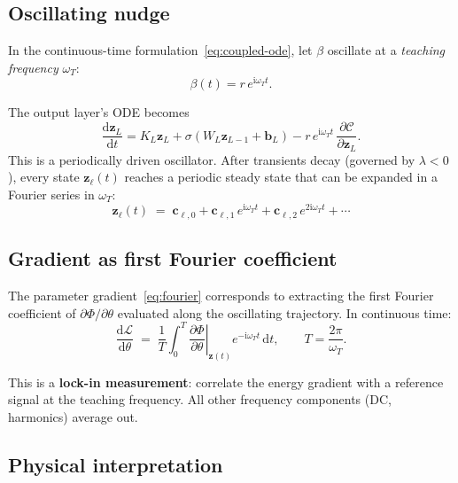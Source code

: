 \documentclass[11pt]{article}
\newcommand{\im}{\mathrm{i}}
\newcommand{\dd}{\mathrm{d}}
\theoremstyle{definition}
\begin{document}
\subsection{Oscillating nudge}

In the continuous-time formulation~\eqref{eq:coupled-ode}, let $\beta$
oscillate at a \emph{teaching frequency} $\omega_T$:
\begin{equation}\label{eq:beta-osc}
  \beta(t) = r\,e^{\im\omega_T t}.
\end{equation}

The output layer's ODE becomes
\begin{equation}
  \frac{\dd\bm{z}_L}{\dd t}
  = K_L\bm{z}_L
  + \sigma(W_L\bm{z}_{L-1}+\bm{b}_L)
  - r\,e^{\im\omega_T t}\,
    \frac{\partial\mathcal{C}}{\partial\bm{z}_L}.
\end{equation}
This is a periodically driven oscillator.  After transients decay
(governed by $\lambda<0$), every state $\bm{z}_\ell(t)$ reaches a
periodic steady state that can be expanded in a Fourier series in
$\omega_T$:
\begin{equation}\label{eq:fourier-state}
  \bm{z}_\ell(t)
  \;=\;
  \bm{c}_{\ell,0}
  + \bm{c}_{\ell,1}\,e^{\im\omega_T t}
  + \bm{c}_{\ell,2}\,e^{2\im\omega_T t}
  + \cdots
\end{equation}

\subsection{Gradient as first Fourier coefficient}

The parameter gradient~\eqref{eq:fourier} corresponds to extracting
the first Fourier coefficient of
$\partial\Phi/\partial\theta$ evaluated along the oscillating trajectory.
In continuous time:
\begin{equation}\label{eq:grad-fourier}
  \frac{\dd\mathcal{L}}{\dd\theta}
  \;=\;
  \frac{1}{T}\int_0^T
    \left.\frac{\partial\Phi}{\partial\theta}\right|_{\bm{z}(t)}
    e^{-\im\omega_T t}\,\dd t,
  \qquad T=\frac{2\pi}{\omega_T}.
\end{equation}

This is a \textbf{lock-in measurement}: correlate the energy gradient
with a reference signal at the teaching frequency.  All other frequency
components (DC, harmonics) average out.

\subsection{Physical interpretation}
\end{document}
